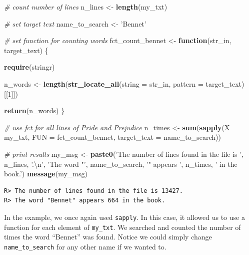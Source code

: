 \documentclass[
  12pt,
]{book}
\newenvironment{Shaded}{\begin{snugshade}}{\end{snugshade}}
\newcommand{\CharTok}[1]{\textcolor[rgb]{0.5,0.5,0.5}{#1}}
\newcommand{\CommentTok}[1]{\textcolor[rgb]{0.37,0.37,0.37}{\textit{#1}}}
\newcommand{\ControlFlowTok}[1]{\textcolor[rgb]{0.27,0.27,0.27}{\textbf{#1}}}
\newcommand{\DataTypeTok}[1]{\textcolor[rgb]{0.27,0.27,0.27}{#1}}
\newcommand{\DecValTok}[1]{\textcolor[rgb]{0.06,0.06,0.06}{#1}}
\newcommand{\KeywordTok}[1]{\textcolor[rgb]{0.27,0.27,0.27}{\textbf{#1}}}
\newcommand{\NormalTok}[1]{#1}
\newcommand{\StringTok}[1]{\textcolor[rgb]{0.5,0.5,0.5}{#1}}
\begin{document}
\begin{Shaded}
\begin{Highlighting}[]
\CommentTok{# count number of lines}
\NormalTok{n_lines <-}\StringTok{ }\KeywordTok{length}\NormalTok{(my_txt)}

\CommentTok{# set target text}
\NormalTok{name_to_search <-}\StringTok{ 'Bennet'}
  
\CommentTok{# set function for counting words}
\NormalTok{fct_count_bennet <-}\StringTok{ }\ControlFlowTok{function}\NormalTok{(str_in, target_text) \{}
  
  \KeywordTok{require}\NormalTok{(stringr)}
  

\NormalTok{  n_words <-}\StringTok{ }\KeywordTok{length}\NormalTok{(}\KeywordTok{str_locate_all}\NormalTok{(}\DataTypeTok{string =}\NormalTok{ str_in, }
                                   \DataTypeTok{pattern =}\NormalTok{ target_text)[[}\DecValTok{1}\NormalTok{]])}
  
  \KeywordTok{return}\NormalTok{(n_words)}
\NormalTok{\}}

\CommentTok{# use fct for all lines of Pride and Prejudice}
\NormalTok{n_times <-}\StringTok{ }\KeywordTok{sum}\NormalTok{(}\KeywordTok{sapply}\NormalTok{(}\DataTypeTok{X =}\NormalTok{ my_txt, }
                      \DataTypeTok{FUN =}\NormalTok{ fct_count_bennet, }
                      \DataTypeTok{target_text =}\NormalTok{ name_to_search))}

\CommentTok{# print results}
\NormalTok{my_msg <-}\StringTok{ }\KeywordTok{paste0}\NormalTok{(}\StringTok{'The number of lines found in the file is '}\NormalTok{, }
\NormalTok{                 n_lines, }\StringTok{'.}\CharTok{\textbackslash{}n}\StringTok{'}\NormalTok{,}
                 \StringTok{'The word "'}\NormalTok{, name_to_search, }\StringTok{'" appears '}\NormalTok{, }
\NormalTok{                 n_times, }\StringTok{' in the book.'}\NormalTok{)}
\KeywordTok{message}\NormalTok{(my_msg)}
\end{Highlighting}
\end{Shaded}

\begin{verbatim}
R> The number of lines found in the file is 13427.
R> The word "Bennet" appears 664 in the book.
\end{verbatim}

In the example, we once again used \texttt{sapply}. In this case, it allowed us to use a function for each element of \texttt{my\_txt}. We searched and counted the number of times the word ``Bennet'' was found. Notice we could simply change \texttt{name\_to\_search} for any other name if we wanted to.
\end{document}
